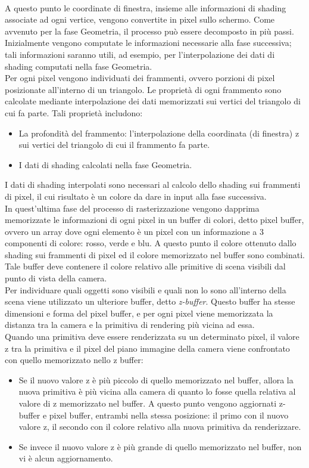 \\
A questo punto le coordinate di finestra, insieme alle informazioni di shading associate ad ogni vertice, vengono convertite in pixel sullo schermo. Come avvenuto per la  fase Geometria, il processo può essere decomposto in più passi.
\\
Inizialmente vengono computate le informazioni necessarie alla fase successiva; tali informazioni saranno utili, ad esempio, per l’interpolazione dei dati di shading computati nella fase Geometria.
\\
Per ogni pixel vengono individuati dei frammenti, ovvero porzioni di pixel posizionate all’interno di un triangolo. Le proprietà di ogni frammento sono calcolate mediante interpolazione dei dati memorizzati sui vertici del triangolo di cui fa parte. 
Tali proprietà includono:
\begin{itemize}
\item La profondità del frammento: l’interpolazione della coordinata (di finestra) z sui vertici del triangolo di cui il frammento fa parte.
\item I dati di shading calcolati nella fase Geometria.
\end{itemize}
I dati di shading interpolati sono necessari al calcolo dello shading sui frammenti di pixel, il cui risultato è un colore da dare in input alla fase successiva.
\\
In quest’ultima fase del processo di rasterizzazione vengono dapprima memorizzate le informazioni di ogni pixel in un buffer di colori, detto pixel buffer, ovvero un array dove ogni elemento è un pixel con un informazione a 3 componenti di colore: rosso, verde e blu.
A questo punto il colore ottenuto dallo shading sui frammenti di pixel ed il colore memorizzato nel buffer sono combinati.
\\
Tale buffer deve contenere il colore relativo alle primitive di scena visibili dal punto di vista della camera.
\\
Per individuare quali oggetti sono visibili e quali non lo sono all’interno della scena viene utilizzato un ulteriore buffer, detto \emph{z-buffer}. Questo buffer ha stesse dimensioni e forma del pixel buffer, e per ogni pixel viene memorizzata la distanza tra la camera e la primitiva di rendering più vicina ad essa.
\\
Quando una primitiva deve essere renderizzata su un determinato pixel, il valore z tra la primitiva e il pixel del piano immagine della camera viene confrontato con quello memorizzato nello z buffer:
\begin{itemize}
\item Se il nuovo valore z è più piccolo di quello memorizzato nel buffer, allora la nuova primitiva è più vicina alla camera di quanto lo fosse quella relativa al valore di z memorizzato nel buffer. A questo punto vengono aggiornati z-buffer e pixel buffer, entrambi nella stessa posizione: il primo con il nuovo valore z, il secondo con il colore relativo alla nuova primitiva da renderizzare. 
\item Se invece il nuovo valore z è più grande di quello memorizzato nel buffer, non vi è alcun aggiornamento.
\end{itemize}
